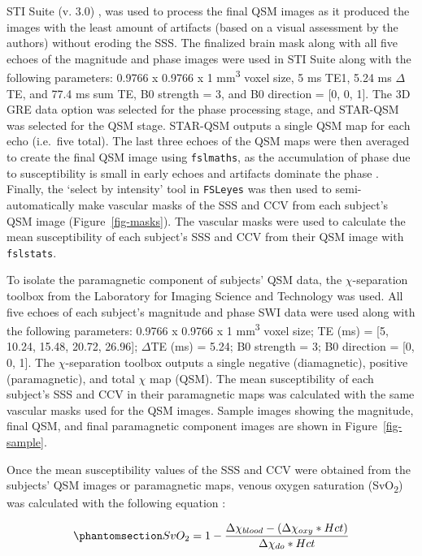 \documentclass[
true
]{sn-jnl}
\begin{document}
STI Suite (v. 3.0) \citep{liIntegratedLaplacianbasedPhase2014}, was used
to process the final QSM images as it produced the images with the least
amount of artifacts (based on a visual assessment by the authors)
without eroding the SSS. The finalized brain mask along with all five
echoes of the magnitude and phase images were used in STI Suite along
with the following parameters: 0.9766 x 0.9766 x 1 mm\textsuperscript{3}
voxel size, 5 ms TE1, 5.24 ms \(\Delta\)TE, and 77.4 ms sum TE, B0
strength = 3, and B0 direction = {[}0, 0, 1{]}. The 3D GRE data option
was selected for the phase processing stage, and STAR-QSM was selected
for the QSM stage. STAR-QSM outputs a single QSM map for each echo
(i.e.~five total). The last three echoes of the QSM maps were then
averaged to create the final QSM image using \texttt{fslmaths}, as the
accumulation of phase due to susceptibility is small in early echoes and
artifacts dominate the phase
\citep{zhangQuantitativeAnalysisPunctate2019}. Finally, the `select by
intensity' tool in \texttt{FSLeyes} was then used to semi-automatically
make vascular masks of the SSS and CCV from each subject's QSM image
(Figure~\ref{fig-masks}). The vascular masks were used to calculate the
mean susceptibility of each subject's SSS and CCV from their QSM image
with \texttt{fslstats}.

To isolate the paramagnetic component of subjects' QSM data, the
\(\chi\)-separation toolbox
\citep{shinHseparationMagneticSusceptibility2021} from the Laboratory
for Imaging Science and Technology was used. All five echoes of each
subject's magnitude and phase SWI data were used along with the
following parameters: 0.9766 x 0.9766 x 1 mm\textsuperscript{3} voxel
size; TE (ms) = {[}5, 10.24, 15.48, 20.72, 26.96{]}; \(\Delta\)TE (ms) =
5.24; B0 strength = 3; B0 direction = {[}0, 0, 1{]}. The
\(\chi\)-separation toolbox outputs a single negative (diamagnetic),
positive (paramagnetic), and total \(\chi\) map (QSM). The mean
susceptibility of each subject's SSS and CCV in their paramagnetic maps
was calculated with the same vascular masks used for the QSM images.
Sample images showing the magnitude, final QSM, and final paramagnetic
component images are shown in Figure~\ref{fig-sample}.

Once the mean susceptibility values of the SSS and CCV were obtained
from the subjects' QSM images or paramagnetic maps, venous oxygen
saturation (SvO\textsubscript{2}) was calculated with the following
equation \citep{bergInvestigatingEffectFlow2021}:

\begin{equation}\phantomsection\label{eq-svo}{
SvO_{2} = 1 - \frac{\Delta \chi _{blood} - (\Delta \chi _{oxy} * Hct)}{\Delta \chi _{do} * Hct}
}\end{equation}
\end{document}
